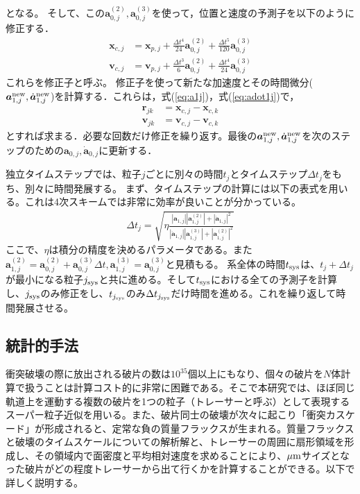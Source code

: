 \documentclass[a4paper,10pt,oneside,twocolumn,notitlepage,final]{jarticle}
\begin{document}
となる。
そして、この${\bm a}_{0,j}^{(2)},{\bm a}_{0,j}^{(3)}$を使って，位置と速度の予測子を以下のように修正する．
\begin{align}
{\bm x}_{c,j} &= {\bm x}_{p,j} + \frac{\Delta t ^4}{24} {\bm a}_{0,j}^{(2)} + \frac{\Delta t ^5}{120} {\bm a}_{0,j}^{(3)}\\
{\bm v}_{c,j} &= {\bm v}_{p,j} + \frac{\Delta t ^3}{6} {\bm a}_{0,j}^{(2)} + \frac{\Delta t ^4}{24} {\bm a}_{0,j}^{(3)}
\end{align}
これらを修正子と呼ぶ。
修正子を使って新たな加速度とその時間微分(${\bm a}_{1,j}^{\rm new},\dot{{\bm a}}_{1,j}^{\rm new}$)を計算する．これらは，式(\ref{eq:a1j})，式(\ref{eq:adot1j})で，
\begin{align}
{\bm r}_{jk} &= {\bm x}_{c,j} - {\bm x}_{c,k}\\
{\bm v}_{jk} &= {\bm v}_{c,j} - {\bm v}_{c,k} 
\end{align}
とすれば求まる．必要な回数だけ修正を繰り返す。最後の${\bm a}_{1,j}^{\rm new},\dot{{\bm a}}_{1,j}^{\rm new}$を次のステップのための${\bm a}_{0,j},\dot{{\bm a}}_{0,j}$に更新する．

独立タイムステップでは、粒子$j$ごとに別々の時間$t_j$とタイムステップ$\Delta t_j$をもち、別々に時間発展する。
まず、タイムステップの計算には以下の表式を用いる\citep{Aarseth1985}。これは4次スキームでは非常に効率が良いことが分かっている\citep{Makino1991}。
\begin{align}
\Delta t_j = \sqrt{\eta \frac{| {\bm a}_{1,j}| | {\bm a}_{1,j}^{(2)} | + | \dot{{\bm a}}_{1,j}| ^2}{| \dot{{\bm a}}_{1,j}| | {\bm a}_{1,j}^{(3)} | + | {\bm a}_{1,j}^{(2)} | ^2}}
\end{align}
ここで、$\eta$は積分の精度を決めるパラメータである。また${\bm a}_{1,j}^{(2)} = {\bm a}_{0,j}^{(2)} + {\bm a}_{0,j}^{(3)} \Delta t, {\bm a}_{1,j}^{(3)} = {\bm a}_{0,j}^{(3)}$と見積もる。
系全体の時間$t_{\rm sys}$は、$t_j + \Delta t_j$が最小になる粒子$j_{\rm sys}$と共に進める。そして$t_{\rm sys}$における全ての予測子を計算し、$j_{\rm sys}$のみ修正をし、$t_{j_{\rm sys}}$のみ$\Delta t_{j_{\rm sys}}$だけ時間を進める。これを繰り返して時間発展させる。

\subsection{統計的手法}
衝突破壊の際に放出される破片の数は$10^{35}$個以上にもなり、個々の破片を$N$体計算で扱うことは計算コスト的に非常に困難である。そこで本研究では、ほぼ同じ軌道上を運動する複数の破片を1つの粒子（トレーサーと呼ぶ）として表現するスーパー粒子近似を用いる。また、破片同士の破壊が次々に起こり「衝突カスケード」が形成されると、定常な負の質量フラックスが生まれる\citep{Tanaka1996}。質量フラックスと破壊のタイムスケールについての解析解\citep{Kobayashi2010}と、トレーサーの周囲に扇形領域\citep{Morishima2015}を形成し、その領域内で面密度と平均相対速度を求めることにより、$\mu {\rm m}$サイズとなった破片がどの程度トレーサーから出て行くかを計算することができる。以下で詳しく説明する。
\end{document}
